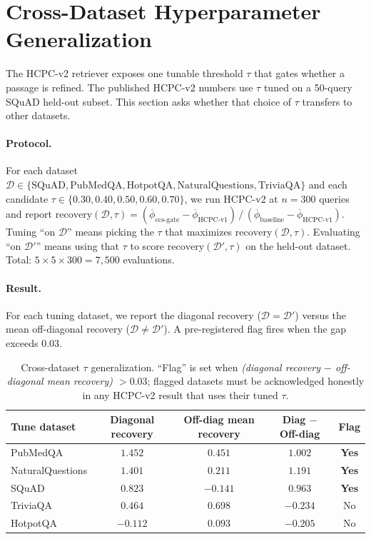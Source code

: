 \section{Cross-Dataset Hyperparameter Generalization}
\label{sec:tau_generalization}

The HCPC-v2 retriever exposes one tunable threshold $\tau$ that
gates whether a passage is refined. The published HCPC-v2 numbers
use $\tau$ tuned on a 50-query SQuAD held-out subset. This section
asks whether that choice of $\tau$ transfers to other datasets.

\paragraph{Protocol.}
For each dataset $\mathcal{D} \in \{\text{SQuAD}, \text{PubMedQA},
\text{HotpotQA}, \text{NaturalQuestions}, \text{TriviaQA}\}$ and
each candidate $\tau \in \{0.30, 0.40, 0.50, 0.60, 0.70\}$, we run
HCPC-v2 at $n{=}300$ queries and report
\(\mathrm{recovery}(\mathcal{D},\tau) =
(\overline{\phi}_{\text{ccs-gate}} - \overline{\phi}_{\text{HCPC-v1}})
\,/\,(\overline{\phi}_{\text{baseline}} - \overline{\phi}_{\text{HCPC-v1}})\).
Tuning ``on $\mathcal{D}$'' means picking the $\tau$ that
maximizes $\mathrm{recovery}(\mathcal{D},\tau)$. Evaluating ``on
$\mathcal{D}'$'' means using that $\tau$ to score
$\mathrm{recovery}(\mathcal{D}',\tau)$ on the held-out dataset.
Total: $5\times 5 \times 300 = 7{,}500$ evaluations.

\paragraph{Result.}
For each tuning dataset, we report the diagonal recovery
($\mathcal{D}=\mathcal{D}'$) versus the mean off-diagonal recovery
($\mathcal{D}\ne\mathcal{D}'$). A pre-registered flag fires when
the gap exceeds $0.03$.

\begin{table}[H]
\centering
\small
\caption{Cross-dataset $\tau$ generalization. ``Flag'' is set when
\emph{(diagonal recovery $-$ off-diagonal mean recovery) $> 0.03$};
flagged datasets must be acknowledged honestly in any HCPC-v2
result that uses their tuned $\tau$.}
\label{tab:tau-generalization}
\begin{tabular}{lcccc}
\toprule
Tune dataset & Diagonal recovery & Off-diag mean recovery &
Diag $-$ Off-diag & Flag \\
\midrule
PubMedQA           & $1.452$ & $0.451$ & $1.002$ & \textbf{Yes} \\
NaturalQuestions   & $1.401$ & $0.211$ & $1.191$ & \textbf{Yes} \\
SQuAD              & $0.823$ & $-0.141$ & $0.963$ & \textbf{Yes} \\
TriviaQA           & $0.464$ & $0.698$ & $-0.234$ & No \\
HotpotQA           & $-0.112$ & $0.093$ & $-0.205$ & No \\
\bottomrule
\end{tabular}
\end{table}

